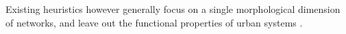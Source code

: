 \documentclass{jimis-en}
\begin{document}

% 










Existing heuristics however generally focus on a single morphological dimension of networks, and leave out the functional properties of urban systems \citep{burger2012form}.
\end{document}
